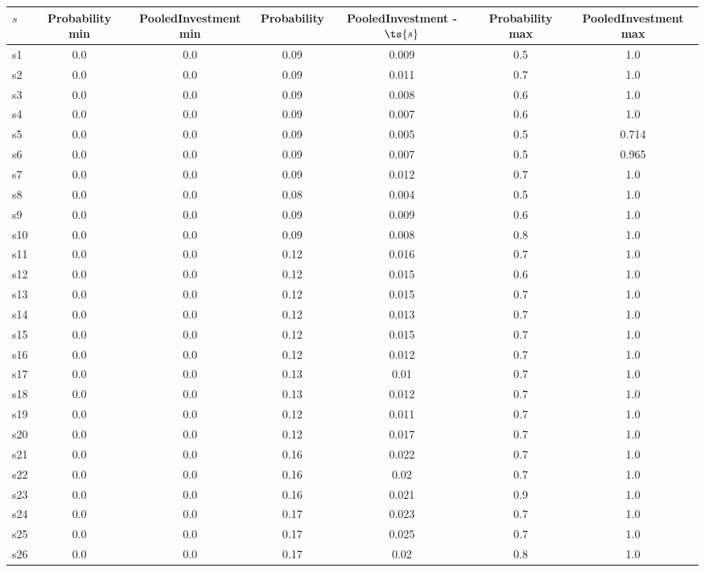 \documentclass{article}
\begin{document}
\noindent\begin{tabular}{|l|c|c|c|c|c|c|}
\hline
$s$& Probability min & PooledInvestment min & Probability & PooledInvestment - $\ts{s}$ & Probability max & PooledInvestment max\\
\hline
s1 &0.0 & 0.0 & 0.09 & 0.009 & 0.5 & 1.0\\
\hline
s2 &0.0 & 0.0 & 0.09 & 0.011 & 0.7 & 1.0\\
\hline
s3 &0.0 & 0.0 & 0.09 & 0.008 & 0.6 & 1.0\\
\hline
s4 &0.0 & 0.0 & 0.09 & 0.007 & 0.6 & 1.0\\
\hline
s5 &0.0 & 0.0 & 0.09 & 0.005 & 0.5 & 0.714\\
\hline
s6 &0.0 & 0.0 & 0.09 & 0.007 & 0.5 & 0.965\\
\hline
s7 &0.0 & 0.0 & 0.09 & 0.012 & 0.7 & 1.0\\
\hline
s8 &0.0 & 0.0 & 0.08 & 0.004 & 0.5 & 1.0\\
\hline
s9 &0.0 & 0.0 & 0.09 & 0.009 & 0.6 & 1.0\\
\hline
s10 &0.0 & 0.0 & 0.09 & 0.008 & 0.8 & 1.0\\
\hline
s11 &0.0 & 0.0 & 0.12 & 0.016 & 0.7 & 1.0\\
\hline
s12 &0.0 & 0.0 & 0.12 & 0.015 & 0.6 & 1.0\\
\hline
s13 &0.0 & 0.0 & 0.12 & 0.015 & 0.7 & 1.0\\
\hline
s14 &0.0 & 0.0 & 0.12 & 0.013 & 0.7 & 1.0\\
\hline
s15 &0.0 & 0.0 & 0.12 & 0.015 & 0.7 & 1.0\\
\hline
s16 &0.0 & 0.0 & 0.12 & 0.012 & 0.7 & 1.0\\
\hline
s17 &0.0 & 0.0 & 0.13 & 0.01 & 0.7 & 1.0\\
\hline
s18 &0.0 & 0.0 & 0.13 & 0.012 & 0.7 & 1.0\\
\hline
s19 &0.0 & 0.0 & 0.12 & 0.011 & 0.7 & 1.0\\
\hline
s20 &0.0 & 0.0 & 0.12 & 0.017 & 0.7 & 1.0\\
\hline
s21 &0.0 & 0.0 & 0.16 & 0.022 & 0.7 & 1.0\\
\hline
s22 &0.0 & 0.0 & 0.16 & 0.02 & 0.7 & 1.0\\
\hline
s23 &0.0 & 0.0 & 0.16 & 0.021 & 0.9 & 1.0\\
\hline
s24 &0.0 & 0.0 & 0.17 & 0.023 & 0.7 & 1.0\\
\hline
s25 &0.0 & 0.0 & 0.17 & 0.025 & 0.7 & 1.0\\
\hline
s26 &0.0 & 0.0 & 0.17 & 0.02 & 0.8 & 1.0\\

\end{tabular}
\end{document}
